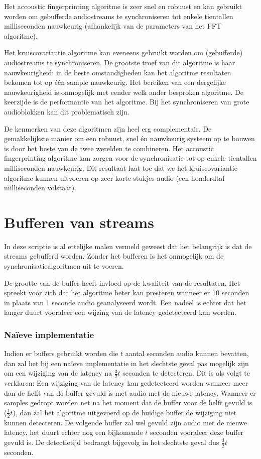 Het accoustic fingerprinting algoritme is zeer snel en robuust en kan gebruikt worden om gebufferde audiostreams te synchroniseren tot enkele tientallen milliseconden nauwkeurig (afhankelijk van de parameters van het FFT algoritme).

Het kruiscovariantie algoritme kan eveneens gebruikt worden om (gebufferde) audiostreams te synchroniseren. De grootste troef van dit algoritme is haar nauwkeurigheid: in de beste omstandigheden kan het algoritme resultaten bekomen tot op één sample nauwkeurig. Het bereiken van een dergelijke nauwkeurigheid is onmogelijk met eender welk ander besproken algoritme. De keerzijde is de performantie van het algoritme. Bij het synchroniseren van grote audioblokken kan dit problematisch zijn.

De kenmerken van deze algoritmen zijn heel erg complementair. De gemakkelijkste manier om een robuust, snel én nauwkeurig systeem op te bouwen is door het beste van de twee werelden te combineren. Het accoustic fingerprinting algoritme kan zorgen voor de synchronisatie tot op enkele tientallen milliseconden nauwkeurig. Dit resultaat laat toe dat we het kruiscovariantie algoritme kunnen uitvoeren op zeer korte stukjes audio (een honderdtal milliseconden volstaat).

\section{Bufferen van streams}
\label{streambuffers}

In deze scriptie is al ettelijke malen vermeld geweest dat het belangrijk is dat de streams gebufferd worden. Zonder het bufferen is het onmogelijk om de synchronisatiealgoritmen uit te voeren. 

De grootte van de buffer heeft invloed op de kwaliteit van de resultaten. Het spreekt voor zich dat het algoritme beter kan presteren wanneer er 10 seconden in plaats van 1 seconde audio geanalyseerd wordt. Een nadeel is echter dat het langer duurt vooraleer een wijzing van de latency gedetecteerd kan worden. 

\subsubsection{Naïeve implementatie}

Indien er buffers gebruikt worden die $ t $ aantal seconden audio kunnen bevatten, dan zal het bij een naïeve implementatie in het slechtste geval pas mogelijk zijn om een wijziging van de latency na $ \frac{3}{2} t $ seconden te detecteren. Dit is als volgt te verklaren: Een wijziging van de latency kan gedetecteerd worden wanneer meer dan de helft van de buffer gevuld is met audio met de nieuwe latency. Wanneer er samples gedropt worden net na het moment dat de buffer voor de helft gevuld is ($ \frac{1}{2} t $), dan zal het algoritme uitgevoerd op de huidige buffer de wijziging niet kunnen detecteren. De volgende buffer zal wel gevuld zijn audio met de nieuwe latency, het duurt echter nog een bijkomende $ t $ seconden vooraleer deze buffer gevuld is. De detectietijd bedraagt bijgevolg in het slechtste geval dus $ \frac{3}{2} t $ seconden.

